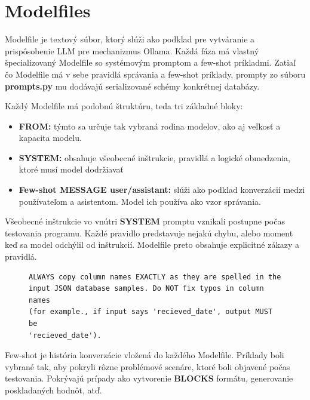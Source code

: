 \section{Modelfiles}
 \label{sub:implementacia_modelfiles}
Modelfile je textový súbor, ktorý slúži ako podklad pre vytváranie a prispôsobenie LLM pre mechanizmus Ollama. Každá fáza má vlastný špecializovaný Modelfile so systémovým promptom a few-shot príkladmi. Zatiaľ čo Modelfile má v sebe pravidlá správania a few-shot príklady, prompty zo súboru \textbf{prompts.py} mu dodávajú serializované schémy konkrétnej databázy.


Každý Modelfile má podobnú štruktúru, teda tri základné bloky:
\begin{itemize}
    \item \textbf{FROM:} týmto sa určuje tak vybraná rodina modelov, ako aj veľkosť a kapacita modelu. 
    \item \textbf{SYSTEM:} obsahuje všeobecné inštrukcie, pravidlá a logické obmedzenia, ktoré musí model dodržiavať
    \item \textbf{Few-shot MESSAGE user/assistant:} slúži ako podklad konverzácií medzi používateľom a asistentom. Model ich používa ako vzor správania.
\end{itemize}

Všeobecné inštrukcie vo vnútri \textbf{SYSTEM} promptu vznikali postupne počas testovania programu. Každé pravidlo predstavuje nejakú chybu, alebo moment keď sa model odchýlil od inštrukcií. Modelfile preto obsahuje explicitné zákazy a pravidlá.

\begin{figure}[H]
    \centering
    \begin{lstlisting}[caption={Príklad pravidla}, label={lst:rule_example}, frame=single, linewidth=0.9\textwidth, xleftmargin=0.05\textwidth]
ALWAYS copy column names EXACTLY as they are spelled in the 
input JSON database samples. Do NOT fix typos in column names
(for example., if input says 'recieved_date', output MUST be 
'recieved_date').
\end{lstlisting}

\end{figure}

Few-shot je história konverzácie vložená do každého Modelfile. Príklady boli vybrané tak, aby pokryli rôzne problémové scenáre, ktoré boli objavené počas testovania. Pokrývajú prípady ako vytvorenie \textbf{BLOCKS} formátu, generovanie poskladaných hodnôt, atď.

